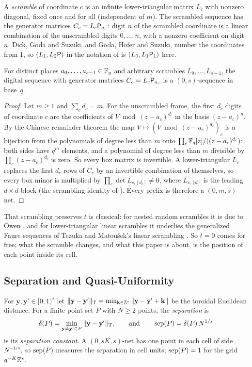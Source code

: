 A \emph{scramble} of coordinate $c$ is an infinite lower-triangular matrix $L_c$ with nonzero diagonal, fixed once and for all (independent of $m$). The scrambled sequence has the generator matrices $C_c=L_c\mathsf{P}_{a_c}$: digit $n$ of the scrambled coordinate is a linear combination of the unscrambled digits $0,\dots,n$, with a nonzero coefficient on digit~$n$. Dick, Goda and Suzuki, and Goda, Hofer and Suzuki, number the coordinates from $1$, so $(L_1,L_2\mathsf{P})$ in the notation of \cite{DGS2} is $(L_0,L_1\mathsf{P}_1)$ here.

\begin{lemma}[Frames have $t=0$]\label{lem:t0}
For distinct places $a_0,\dots,a_{s-1}\in\mathbb{F}_q$ and arbitrary scrambles $L_0,\dots,L_{s-1}$, the digital sequence with generator matrices $C_c=L_c\mathsf{P}_{a_c}$ is a $(0,s)$-sequence in base~$q$.
\end{lemma}

\begin{proof}
Let $m\ge1$ and $\sum_cd_c=m$. For the unscrambled frame, the first $d_c$ digits of coordinate $c$ are the coefficients of $V\bmod(z-a_c)^{d_c}$ in the basis $(z-a_c)^n$. By the Chinese remainder theorem the map $V\mapsto(V\bmod(z-a_c)^{d_c})_c$ is a bijection from the polynomials of degree less than $m$ onto $\prod_c\mathbb{F}_q[z]/((z-a_c)^{d_c})$: both sides have $q^m$ elements, and a polynomial of degree less than $m$ divisible by $\prod_c(z-a_c)^{d_c}$ is zero. So every box matrix is invertible. A lower-triangular $L_c$ replaces the first $d_c$ rows of $C_c$ by an invertible combination of themselves, so every box minor is multiplied by $\prod_c\det L_{c,[d_c]}\ne0$, where $L_{c,[d]}$ is the leading $d\times d$ block (the scrambling identity of \cite{Gru26geo}%
). Every prefix is therefore a $(0,m,s)$-net.
\end{proof}

That scrambling preserves $t$ is classical: for nested random scrambles it is due to Owen \cite{Owe95}, and for lower-triangular linear scrambles it underlies the generalized Faure sequences of Tezuka \cite{Tez95} and Matou\v{s}ek's linear scrambling \cite{Mat98}. So $t=0$ comes for free; what the scramble changes, and what this paper is about, is the position of each point inside its cell.

\subsection{Separation and Quasi-Uniformity}
For $\mathbf y,\mathbf y'\in[0,1)^s$ let $\|\mathbf y-\mathbf y'\|_{\mathrm T}=\min_{\mathbf k\in\mathbb{Z}^s}\|\mathbf y-\mathbf y'+\mathbf k\|$ be the toroidal Euclidean distance. For a finite point set $P$ with $N\ge2$ points, the \emph{separation} is
\[
\delta(P)=\min_{\mathbf y\ne\mathbf y'\in P}\|\mathbf y-\mathbf y'\|_{\mathrm T},\qquad\text{and}\qquad \operatorname{sep}(P)=\delta(P)\,N^{1/s}
\]
is its \emph{separation constant}. A $(0,sK,s)$-net has one point in each cell of side $N^{-1/s}$, so $\operatorname{sep}(P)$ measures the separation in cell units; $\operatorname{sep}(P)=1$ for the grid $q^{-K}\mathbb{Z}^s$.

